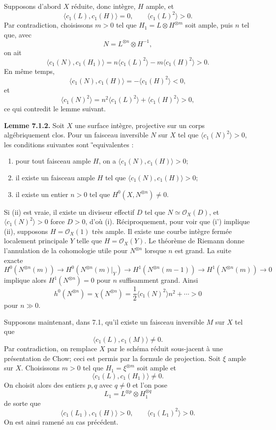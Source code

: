 \documentclass[11pt]{article}
\begin{document}
Supposons d'abord $X$ r\'eduite, donc int\`egre, $H$ ample, et
\[
   \langle c_1(L),c_1(H)\rangle=0,
   \qquad
   \langle c_1(L)^2\rangle>0.
\]
Par contradiction, choisissons $m>0$ tel que $H_1=L\otimes H^{\otimes m}$ soit ample, puis $n$ tel que, avec
\[
   N=L^{\otimes n}\otimes H^{-1},
\]
on ait
\[
   \langle c_1(N),c_1(H_1)\rangle
   =n\langle c_1(L)^2\rangle-m\langle c_1(H)^2\rangle>0.
\]
En m\^eme temps,
\[
   \langle c_1(N),c_1(H)\rangle=-\langle c_1(H)^2\rangle<0,
\]
et
\[
   \langle c_1(N)^2\rangle=n^2\langle c_1(L)^2\rangle+\langle c_1(H)^2\rangle>0,
\]
ce qui contredit le lemme suivant.

\textbf{Lemme 7.1.2.} Soit $X$ une surface int\`egre, projective sur un corps alg\'ebriquement clos. Pour un faisceau inversible $N$ sur $X$ tel que $\langle c_1(N)^2\rangle>0$, les conditions suivantes sont \='equivalentes :
\begin{enumerate}[label=\roman*)]
\item pour tout faisceau ample $H$, on a $\langle c_1(N),c_1(H)\rangle>0$;
\item[(i')] il existe un faisceau ample $H$ tel que $\langle c_1(N),c_1(H)\rangle>0$;
\item il existe un entier $n>0$ tel que $H^0(X,N^{\otimes n})\ne0$.
\end{enumerate}
Si (ii) est vraie, il existe un diviseur effectif $D$ tel que $N\simeq\mathcal O_X(D)$, et $\langle c_1(N)^2\rangle>0$ force $D>0$, d'o\`u (i). R\'eciproquement, pour voir que (i') implique (ii), supposons $H=\mathcal O_X(1)$ tr\`es ample. Il existe une courbe int\`egre ferm\'ee localement principale $Y$ telle que $H=\mathcal O_X(Y)$. Le th\'eor\`eme de Riemann donne l'annulation de la cohomologie utile pour $N^{\otimes n}$ lorsque $n$ est grand. La suite exacte
\[
 H^0(N^{\otimes n}(m))\to H^0(N^{\otimes n}(m)|_Y)\to
 H^1(N^{\otimes n}(m-1))\to H^1(N^{\otimes n}(m))\to0
\]
implique alors $H^1(N^{\otimes n})=0$ pour $n$ suffisamment grand. Ainsi
\[
   h^0(N^{\otimes n})=\chi(N^{\otimes n})=\frac12\langle c_1(N)^2\rangle n^2+\cdots>0
\]
pour $n\gg0$.

Supposons maintenant, dans 7.1, qu'il existe un faisceau inversible $M$ sur $X$ tel que
\[
   \langle c_1(L),c_1(M)\rangle\ne0.
\]
Par contradiction, on remplace $X$ par le sch\'ema r\'eduit sous-jacent \`a une pr\'esentation de Chow; ceci est permis par la formule de projection. Soit $\xi$ ample sur $X$. Choisissons $m>0$ tel que $H_1=\xi^{\otimes m}$ soit ample et
\[
   \langle c_1(L),c_1(H_1)\rangle\ne0.
\]
On choisit alors des entiers $p,q$ avec $q\ne0$ et l'on pose
\[
   L_1=L^{\otimes p}\otimes H_1^{\otimes q}
\]
de sorte que
\[
   \langle c_1(L_1),c_1(H)\rangle>0,
   \qquad
   \langle c_1(L_1)^2\rangle>0.
\]
On est ainsi ramen\'e au cas pr\'ec\'edent.
\end{document}
